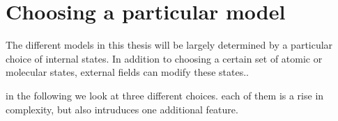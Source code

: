 

\section{Choosing a particular model}
The different models in this thesis will be largely determined by a particular choice of internal states.
In addition to choosing a certain set of atomic or molecular states, external fields can modify these states..

in the following we look at three different choices. each of them is a rise in complexity, but also intruduces one additional feature.



